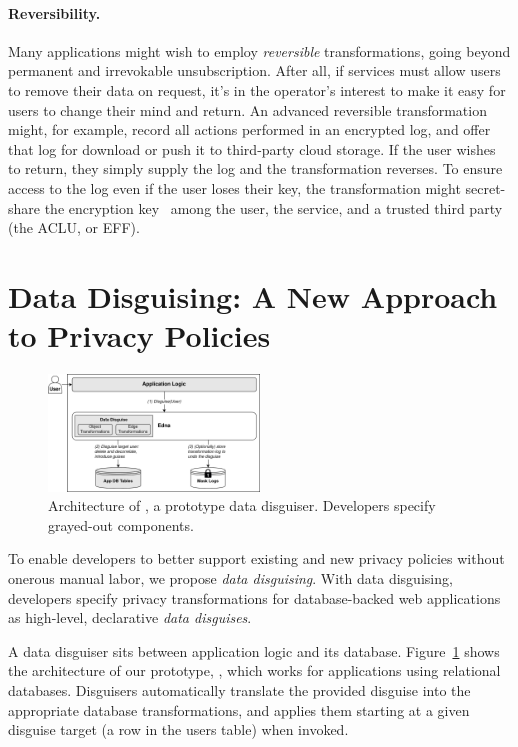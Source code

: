 \paragraph{Reversibility.}
%
Many applications might wish to employ \emph{reversible} transformations, going beyond permanent
and irrevokable unsubscription.
%
After all, if services must allow users to remove their data on request, it's in the operator's
interest to make it easy for users to change their mind and return.
%
An advanced reversible transformation might, for example, record all actions performed in an
encrypted log, and offer that log for download or push it to third-party cloud storage.
%
If the user wishes to return, they simply supply the log and the transformation reverses.
%
To ensure access to the log even if the user loses their key, the transformation might
secret-share the encryption key~\cite{secretsharing} among the user, the service, and a trusted
third party (\eg the ACLU, or EFF).
%



\section{Data Disguising: A New Approach to Privacy Policies}
\begin{figure}[t!]
    \centering
    \includegraphics[width=0.5\textwidth]{img/impl}

    \caption{Architecture of \sys, a prototype data disguiser. Developers specify grayed-out components.}
    \label{fig:arch}
\end{figure}

To enable developers to better support existing and new privacy policies without onerous manual
labor, we propose \emph{data disguising}.
%
With data disguising, developers specify privacy transformations for database-backed web
applications as high-level, declarative \emph{data disguises}.

A data disguiser sits between application logic and its database. Figure~\ref{fig:arch} shows the
architecture of our prototype, \sys, which works for applications using relational databases.
Disguisers automatically translate the provided disguise into the appropriate database transformations, and
applies them starting at a given disguise target (\eg a row in the users table) when invoked.

